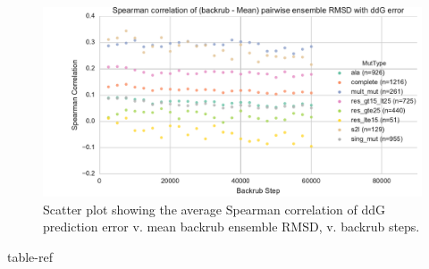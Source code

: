 \begin{figure}
  \includegraphics[width=\textwidth,keepaspectratio]{figures/t14-spear-corr.pdf}
  \caption{
    Scatter plot showing the average Spearman correlation of ddG prediction error v. mean backrub ensemble RMSD, v. backrub steps.
  } \label{fig:spear-corr-rmsd-error}
\end{figure}

{table-ref}